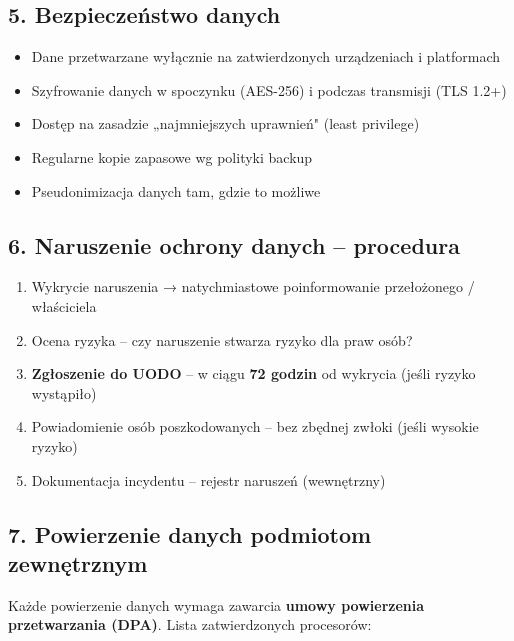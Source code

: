 \documentclass[12pt,a4paper]{article}
\providecommand{\tightlist}{\setlength{\itemsep}{0pt}\setlength{\parskip}{0pt}}
\begin{document}
\subsection{5. Bezpieczeństwo danych}\label{bezpieczeux144stwo-danych}

\begin{itemize}
\tightlist
\item
  Dane przetwarzane wyłącznie na zatwierdzonych urządzeniach i
  platformach
\item
  Szyfrowanie danych w spoczynku (AES-256) i podczas transmisji (TLS
  1.2+)
\item
  Dostęp na zasadzie „najmniejszych uprawnień" (least privilege)
\item
  Regularne kopie zapasowe wg polityki backup
\item
  Pseudonimizacja danych tam, gdzie to możliwe
\end{itemize}

\subsection{6. Naruszenie ochrony danych --
procedura}\label{naruszenie-ochrony-danych-procedura}

\begin{enumerate}
\tightlist
\item
  Wykrycie naruszenia → natychmiastowe poinformowanie przełożonego /
  właściciela
\item
  Ocena ryzyka -- czy naruszenie stwarza ryzyko dla praw osób?
\item
  \textbf{Zgłoszenie do UODO} -- w ciągu \textbf{72 godzin} od wykrycia
  (jeśli ryzyko wystąpiło)
\item
  Powiadomienie osób poszkodowanych -- bez zbędnej zwłoki (jeśli wysokie
  ryzyko)
\item
  Dokumentacja incydentu -- rejestr naruszeń (wewnętrzny)
\end{enumerate}

\subsection{7. Powierzenie danych podmiotom
zewnętrznym}\label{powierzenie-danych-podmiotom-zewnux119trznym}

Każde powierzenie danych wymaga zawarcia \textbf{umowy powierzenia
przetwarzania (DPA)}. Lista zatwierdzonych procesorów:
\end{document}
